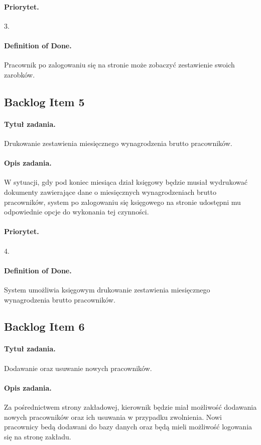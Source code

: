 \documentclass[a4paper]{article}
\begin{document}
\paragraph{Priorytet.} 3.
\paragraph{Definition of Done.} Pracownik po zalogowaniu się na stronie może zobaczyć zestawienie swoich zarobków.

\subsection{Backlog Item 5}
\paragraph{Tytuł zadania.} Drukowanie zestawienia miesięcznego wynagrodzenia brutto pracowników.
\paragraph{Opis zadania.} W sytuacji, gdy pod koniec miesiąca dział księgowy będzie musiał wydrukować dokumenty zawierające dane o miesięcznych wynagrodzeniach brutto pracowników, system po zalogowaniu się księgowego na stronie udostępni mu odpowiednie opcje do wykonania tej czynności.
\paragraph{Priorytet.} 4.
\paragraph{Definition of Done.} System umożliwia księgowym drukowanie zestawienia miesięcznego wynagrodzenia brutto pracowników.


\subsection{Backlog Item 6}
\paragraph{Tytuł zadania.} Dodawanie oraz usuwanie nowych pracowników.
\paragraph{Opis zadania.} Za pośrednictwem strony zakładowej, kierownik będzie miał możliwość dodawania nowych pracowników oraz ich usuwania w przypadku zwolnienia. Nowi pracownicy bedą dodawani do bazy danych oraz będą mieli możliwość logowania się na stronę zakładu.
\end{document}
